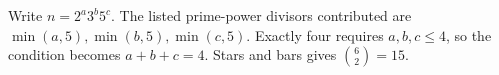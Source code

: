 Write $n=2^a3^b5^c$. The listed prime-power divisors contributed are $\min(a,5),\min(b,5),\min(c,5)$. Exactly four requires $a,b,c\le4$, so the condition becomes $a+b+c=4$. Stars and bars gives $\binom62=\boxed{15}$.
